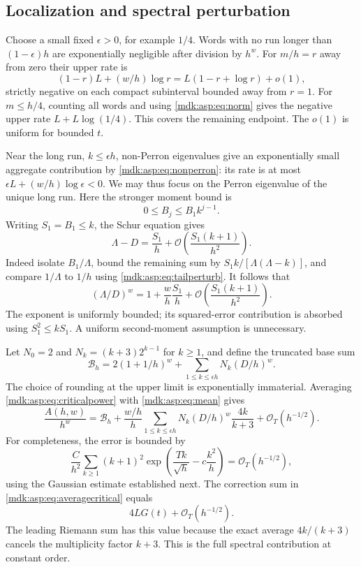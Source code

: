 \documentclass[11pt,letterpaper]{article}
\numberwithin{equation}{section}
\theoremstyle{remark}\newtheorem{remark}[theorem]{Remark}
\newcommand{\Oh}{\mathcal O}\newcommand{\Q}{\mathbb Q}\newcommand{\N}{\mathbb N}\newcommand{\R}{\mathbb R}
\begin{document}
\subsection{Localization and spectral perturbation}
Choose a small fixed $\epsilon>0$, for example $1/4$. Words with no run longer than $(1-\epsilon)h$ are exponentially negligible after division by $h^w$. For $m/h=r$ away from zero their upper rate is
\[
(1-r)L+(w/h)\log r=L(1-r+\log r)+o(1),
\]
strictly negative on each compact subinterval bounded away from $r=1$. For $m\le h/4$, counting all words and using \eqref{mdk:asp:eq:norm} gives the negative upper rate $L+L\log(1/4)$. This covers the remaining endpoint. The $o(1)$ is uniform for bounded $t$.

Near the long run, $k\le\epsilon h$, non-Perron eigenvalues give an exponentially small aggregate contribution by \eqref{mdk:asp:eq:nonperron}: its rate is at most $\epsilon L+(w/h)\log\epsilon<0$. We may thus focus on the Perron eigenvalue of the unique long run. Here the stronger moment bound is
\[
0\le B_j\le B_1 k^{j-1}.
\]
Writing $S_1=B_1\le k$, the Schur equation gives
\begin{equation}\label{mdk:asp:eq:criticaldelta}
\Lambda-D=\frac{S_1}{h}+\Oh\left(\frac{S_1(k+1)}{h^2}\right).
\end{equation}
Indeed isolate $B_1/\Lambda$, bound the remaining sum by
$S_1k/[\Lambda(\Lambda-k)]$, and compare $1/\Lambda$ to $1/h$ using \eqref{mdk:asp:eq:tailperturb}. It follows that
\begin{equation}\label{mdk:asp:eq:criticalpower}
(\Lambda/D)^w=1+\frac{w}{h}\frac{S_1}{h}
+\Oh\left(\frac{S_1(k+1)}{h^2}\right).
\end{equation}
The exponent is uniformly bounded; its squared-error contribution is absorbed using $S_1^2\le kS_1$. A uniform second-moment assumption is unnecessary.

Let $N_0=2$ and $N_k=(k+3)2^{k-1}$ for $k\ge1$, and define the truncated base sum
\begin{equation}\label{mdk:asp:eq:Bbase}
\mathcal B_h=2(1+1/h)^w+\sum_{1\le k\le\epsilon h}N_k(D/h)^w.
\end{equation}
The choice of rounding at the upper limit is exponentially immaterial. Averaging \eqref{mdk:asp:eq:criticalpower} with \eqref{mdk:asp:eq:mean} gives
\begin{equation}\label{mdk:asp:eq:averagecritical}
\frac{A(h,w)}{h^w}=\mathcal B_h+
\frac{w/h}{h}\sum_{1\le k\le\epsilon h}N_k(D/h)^w\frac{4k}{k+3}
+\Oh_T(h^{-1/2}).
\end{equation}
For completeness, the error is bounded by
\[
\frac{C}{h^2}\sum_{k\ge1}(k+1)^2
\exp\left(\frac{Tk}{\sqrt h}-c\frac{k^2}{h}\right)=\Oh_T(h^{-1/2}),
\]
using the Gaussian estimate established next. The correction sum in \eqref{mdk:asp:eq:averagecritical} equals
\begin{equation}\label{mdk:asp:eq:4LG}
4LG(t)+\Oh_T(h^{-1/2}).
\end{equation}
The leading Riemann sum has this value because the exact average $4k/(k+3)$ cancels the multiplicity factor $k+3$. This is the full spectral contribution at constant order.
\end{document}
